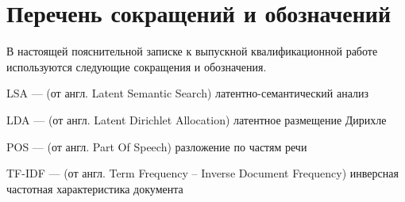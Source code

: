 \documentclass[../main]{subfiles}
\begin{document}
\newpage
{}
{}
\section*{Перечень сокращений и обозначений}

В настоящей пояснительной записке к выпускной квалификационной
работе используются следующие сокращения и обозначения.

\begin{termenum}
    \item LSA --- (от англ. Latent Semantic Search) латентно-семантический анализ
    \item LDA --- (от англ. Latent Dirichlet Allocation) латентное размещение Дирихле
    \item POS --- (от англ. Part Of Speech) разложение по частям речи
    \item TF-IDF --- (от англ. Term Frequency -- Inverse Document Frequency) инверсная частотная характеристика документа
\end{termenum}
\end{document}
